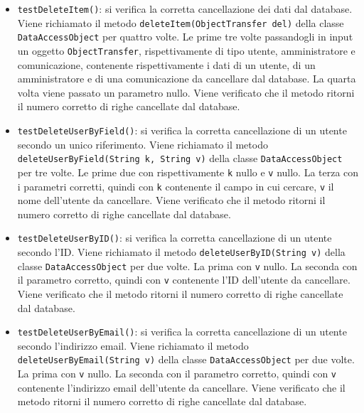 {{\begin{itemize}
\begin{itemize}
\begin{itemize}
						\item \texttt{testDeleteItem()}: si verifica la corretta cancellazione dei dati dal database. Viene richiamato il metodo \texttt{deleteItem(ObjectTransfer del)} della classe \texttt{DataAccessObject} per quattro volte. Le prime tre volte passandogli in input un oggetto \texttt{ObjectTransfer}, rispettivamente di tipo utente, amministratore e comunicazione, contenente rispettivamente i dati di un utente, di un amministratore e di una comunicazione da cancellare dal database. La quarta volta viene passato un parametro nullo. Viene verificato che il metodo ritorni il numero corretto di righe cancellate dal database.
						
						\item \texttt{testDeleteUserByField()}: si verifica la corretta cancellazione di un utente secondo un unico riferimento. Viene richiamato il metodo \newline \texttt{deleteUserByField(String k, String v)} della classe \newline \texttt{DataAccessObject} per tre volte. Le prime due con rispettivamente \texttt{k} nullo e \texttt{v} nullo. La terza con i parametri corretti, quindi con \texttt{k} contenente il campo in cui cercare, \texttt{v} il nome dell'utente da cancellare. Viene verificato che il metodo ritorni il numero corretto di righe cancellate dal database.
						
						\item \texttt{testDeleteUserByID()}: si verifica la corretta cancellazione di un utente secondo l'ID. Viene richiamato il metodo \texttt{deleteUserByID(String v)} della classe \texttt{DataAccessObject} per due volte. La prima con \texttt{v} nullo. La seconda con il parametro corretto, quindi con \texttt{v} contenente l'ID dell'utente da cancellare. Viene verificato che il metodo ritorni il numero corretto di righe cancellate dal database.
						
						\item \texttt{testDeleteUserByEmail()}: si verifica la corretta cancellazione di un utente secondo l'indirizzo email. Viene richiamato il metodo \newline \texttt{deleteUserByEmail(String v)} della classe \texttt{DataAccessObject} per due volte. La prima con \texttt{v} nullo. La seconda con il parametro corretto, quindi con \texttt{v} contenente l'indirizzo email dell'utente da cancellare. Viene verificato che il metodo ritorni il numero corretto di righe cancellate dal database.
						

\end{itemize}
\end{itemize}
\end{itemize}}}
